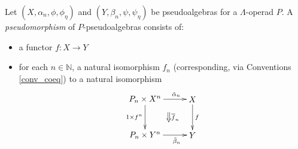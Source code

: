 \begin{Defi}\label{Defi:pseudomorphism-lop}
Let $(X, \alpha_n,\phi,\phi_\eta)$ and $(Y, \beta_n,\psi,\psi_{\eta})$ be pseudoalgebras for a $\Lambda$-operad $P$. A \textit{pseudomorphism} of $P$-pseudoalgebras consists of: 
    \begin{itemize}
        \item a functor $f \colon X \rightarrow Y$
        \item for each $n \in \mathbb{N}$, a natural isomorphism $f_n$ (corresponding, via Conventions \ref{conv_coeq}) to a natural isomorphism
            \[
                \xy
                    (0,0)*+{P_n \times X^n}="00";
                    (20,0)*+{X}="10";
                    (0,-15)*+{P_n \times Y^n}="01";
                    (20,-15)*+{Y}="11";
                    {\ar^>>>>>{\tilde{\alpha}_n} "00" ; "10"};
                    {\ar^{f} "10" ; "11"};
                    {\ar_{1 \times f^n} "00" ; "01"};
                    {\ar_>>>>>{\tilde{\beta}_n} "01" ; "11"};
                    {\ar@{=>}^{\overline{f}_n} (10,-5.5) ; (10,-9.5)};
                \endxy
            \]


\end{itemize}
\end{Defi}
